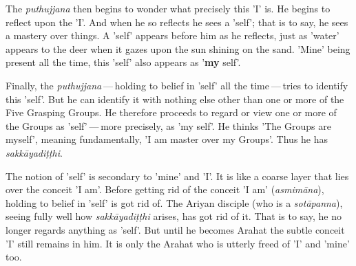 The \emph{puthujjana} then begins to wonder what precisely this 'I' is. He
begins to reflect upon the 'I'. And when he so reflects he sees a
'self'; that is to say, he sees a mastery over things. A 'self' appears
before him as he reflects, just as 'water' appears to the deer when it
gazes upon the sun shining on the sand. 'Mine' being present all the
time, this 'self' also appears as '\textbf{my} self'.


Finally, the \emph{puthujjana} — holding to belief in 'self' all the time — tries to identify this 'self'. But he can identify it with nothing else
other than one or more of the Five Grasping Groups. He therefore
proceeds to regard or view one or more of the Groups as 'self' — more
precisely, as 'my self'. He thinks 'The Groups are myself', meaning
fundamentally, 'I am master over my Groups'. Thus he has
\emph{sakkāyadiṭṭhi}.


The notion of 'self' is secondary to 'mine' and 'I'. It is like a coarse
layer that lies over the conceit 'I am'. Before getting rid of the
conceit 'I am' (\emph{asmimāna}), holding to belief in 'self' is got rid
of. The Ariyan disciple (who is a \emph{sotāpanna}), seeing fully well how
\emph{sakkāyadiṭṭhi} arises, has got rid of it. That is to say, he no longer
regards anything as 'self'. But until he becomes Arahat the subtle
conceit 'I' still remains in him. It is only the Arahat who is utterly
freed of 'I' and 'mine' too.


